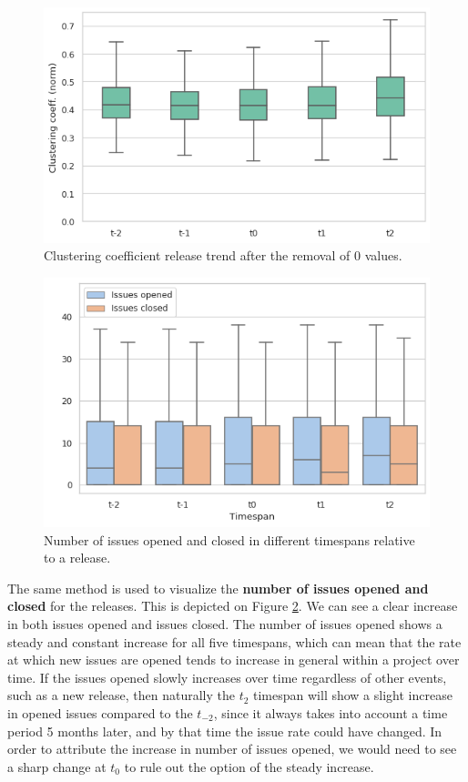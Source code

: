 \begin{figure}
    \centering
    \includegraphics[width=\textwidth]{figures/quantitative/boxplots/clustering.png}
    \caption{Clustering coefficient release trend after the removal of 0 values.}
    \label{fig:clustering-box}
\end{figure}

\begin{figure}
    \centering
    \includegraphics[width=\textwidth]{figures/quantitative/boxplots/issues.png}
    \caption{Number of issues opened and closed in different timespans relative to a release.}
    \label{fig:issues-box}
\end{figure}

The same method is used to visualize the \textbf{number of issues opened and closed} for the releases. This is depicted on Figure \ref{fig:issues-box}. We can see a clear increase in both issues opened and issues closed. The number of issues opened shows a steady and constant increase  for all five timespans, which can mean that the rate at which new issues are opened tends to increase in general within a project over time. If the issues opened slowly increases over time regardless of other events, such as a new release, then naturally the $t_2$ timespan will show a slight increase in opened issues compared to the $t_{-2}$, since it always takes into account a time period 5 months later, and by that time the issue rate could have changed. In order to attribute the increase in number of issues opened, we would need to see a sharp change at $t_0$ to rule out the option of the steady increase.

